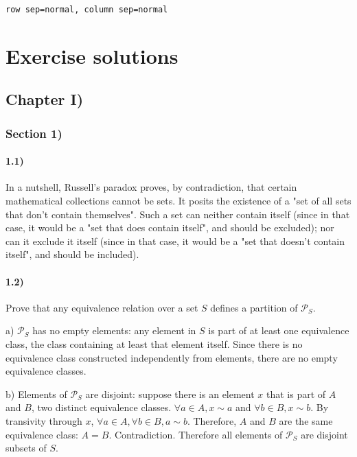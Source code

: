 \documentclass[12pt, letterpaper, twoside]{report}
\begin{document}
\texttt{row sep=normal, column sep=normal}

\author{Multiversity \textit{Algebra Chapter 0} Reading Group}
\part{Exercise solutions}
\chapter*{Chapter I)}

\section*{Section 1)}

\subsection*{1.1)}

In a nutshell, Russell's paradox proves, by contradiction, that certain mathematical collections cannot be sets. It posits the existence of a "set of all sets that don't contain themselves". Such a set can neither contain itself (since in that case, it would be a "set that does contain itself", and should be excluded); nor can it exclude it itself (since in that case, it would be a "set that doesn't contain itself", and should be included).



\subsection*{1.2)}

Prove that any equivalence relation over a set $S$ defines a partition of $\mathcal{P}_S$.

a) $\mathcal{P}_S$ has no empty elements: any element in $S$ is part of at least one equivalence class, the class containing at least that element itself. Since there is no equivalence class constructed independently from elements, there are no empty equivalence classes.

b) Elements of $\mathcal{P}_S$ are disjoint: suppose there is an element $x$ that is part of $A$ and $B$, two distinct equivalence classes. $\forall a \in A, x \sim a$ and $\forall b \in B, x \sim b$. By transivity through $x$, $\forall a \in A, \forall b \in B, a \sim b$. Therefore, $A$ and $B$ are the same equivalence class: $A = B$. Contradiction. Therefore all elements of $\mathcal{P}_S$ are disjoint subsets of $S$.
\end{document}
